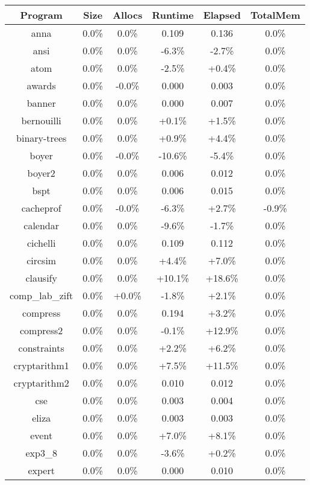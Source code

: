 \begin{tabular}{ c c c c c c }
Program & Size & Allocs & Runtime & Elapsed & TotalMem\\
\hline
anna &  0.0\% &  0.0\% & 0.109 & 0.136 &  0.0\%\\
ansi &  0.0\% &  0.0\% & -6.3\% & -2.7\% &  0.0\%\\
atom &  0.0\% &  0.0\% & -2.5\% & +0.4\% &  0.0\%\\
awards &  0.0\% & -0.0\% & 0.000 & 0.003 &  0.0\%\\
banner &  0.0\% &  0.0\% & 0.000 & 0.007 &  0.0\%\\
bernouilli &  0.0\% &  0.0\% & +0.1\% & +1.5\% &  0.0\%\\
binary-trees &  0.0\% &  0.0\% & +0.9\% & +4.4\% &  0.0\%\\
boyer &  0.0\% & -0.0\% & -10.6\% & -5.4\% &  0.0\%\\
boyer2 &  0.0\% &  0.0\% & 0.006 & 0.012 &  0.0\%\\
bspt &  0.0\% &  0.0\% & 0.006 & 0.015 &  0.0\%\\
cacheprof &  0.0\% & -0.0\% & -6.3\% & +2.7\% & -0.9\%\\
calendar &  0.0\% &  0.0\% & -9.6\% & -1.7\% &  0.0\%\\
cichelli &  0.0\% &  0.0\% & 0.109 & 0.112 &  0.0\%\\
circsim &  0.0\% &  0.0\% & +4.4\% & +7.0\% &  0.0\%\\
clausify &  0.0\% &  0.0\% & +10.1\% & +18.6\% &  0.0\%\\
comp\_lab\_zift &  0.0\% & +0.0\% & -1.8\% & +2.1\% &  0.0\%\\
compress &  0.0\% &  0.0\% & 0.194 & +3.2\% &  0.0\%\\
compress2 &  0.0\% &  0.0\% & -0.1\% & +12.9\% &  0.0\%\\
constraints &  0.0\% &  0.0\% & +2.2\% & +6.2\% &  0.0\%\\
cryptarithm1 &  0.0\% &  0.0\% & +7.5\% & +11.5\% &  0.0\%\\
cryptarithm2 &  0.0\% &  0.0\% & 0.010 & 0.012 &  0.0\%\\
cse &  0.0\% &  0.0\% & 0.003 & 0.004 &  0.0\%\\
eliza &  0.0\% &  0.0\% & 0.003 & 0.003 &  0.0\%\\
event &  0.0\% &  0.0\% & +7.0\% & +8.1\% &  0.0\%\\
exp3\_8 &  0.0\% &  0.0\% & -3.6\% & +0.2\% &  0.0\%\\
expert &  0.0\% &  0.0\% & 0.000 & 0.010 &  0.0\%\\

\end{tabular}
